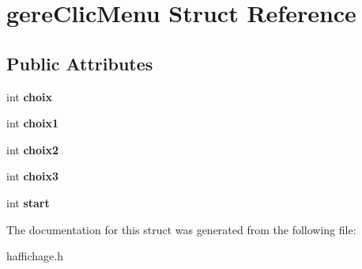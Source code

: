 \hypertarget{structgereClicMenu}{}\section{gere\+Clic\+Menu Struct Reference}
\label{structgereClicMenu}
\subsection*{Public Attributes}
\begin{DoxyCompactItemize}
\item 
int {\bfseries choix}\hypertarget{structgereClicMenu_a19816b3ed7f02217c56df721b5aa6f53}{}\label{structgereClicMenu_a19816b3ed7f02217c56df721b5aa6f53}

\item 
int {\bfseries choix1}\hypertarget{structgereClicMenu_adf17c483ab54d455271483c9ad3d4204}{}\label{structgereClicMenu_adf17c483ab54d455271483c9ad3d4204}

\item 
int {\bfseries choix2}\hypertarget{structgereClicMenu_a8d7e49218199a1e5727244bb54a6ea74}{}\label{structgereClicMenu_a8d7e49218199a1e5727244bb54a6ea74}

\item 
int {\bfseries choix3}\hypertarget{structgereClicMenu_a66206c4eca6d59ab569ec9a6cb6349fb}{}\label{structgereClicMenu_a66206c4eca6d59ab569ec9a6cb6349fb}

\item 
int {\bfseries start}\hypertarget{structgereClicMenu_a25e04719e259bfc4a4219eb8532d10a3}{}\label{structgereClicMenu_a25e04719e259bfc4a4219eb8532d10a3}

\end{DoxyCompactItemize}


The documentation for this struct was generated from the following file\+:\begin{DoxyCompactItemize}
\item 
haffichage.\+h\end{DoxyCompactItemize}
